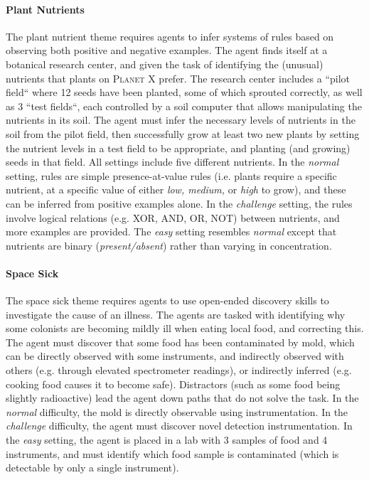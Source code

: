 \documentclass{article}
\newcommand{\planetX}{\textsc{Planet X}\xspace}
\begin{document}
\paragraph{Plant Nutrients} The plant nutrient theme requires agents to infer systems of rules based on observing both positive and negative examples.  The agent finds itself at a botanical research center, and given the task of identifying the (unusual) nutrients that plants on \planetX prefer.  The research center includes a ``pilot field`` where 12 seeds have been planted, some of which sprouted correctly, as well as 3 ``test fields``, each controlled by a soil computer that allows manipulating the nutrients in its soil.  The agent must infer the necessary levels of nutrients in the soil from the pilot field, then successfully grow at least two new plants by setting the nutrient levels in a test field to be appropriate, and planting (and growing) seeds in that field.  All settings include five different nutrients.  In the \textit{normal} setting, rules are simple presence-at-value rules (i.e. plants require a specific nutrient, at a specific value of either \textit{low, medium,} or \textit{high} to grow), and these can be inferred from positive examples alone.  In the \textit{challenge} setting, the rules involve logical relations (e.g. \textsc{XOR}, \textsc{AND}, \textsc{OR}, \textsc{NOT}) between nutrients, and more examples are provided.  The \textit{easy} setting resembles \textit{normal} except that nutrients are binary (\textit{present/absent}) rather than varying in concentration.

\paragraph{Space Sick} The space sick theme requires agents to use open-ended discovery skills to investigate the cause of an illness.  The agents are tasked with identifying why some colonists are becoming mildly ill when eating local food, and correcting this.  The agent must discover that some food has been contaminated by mold, which can be directly observed with some instruments, and indirectly observed with others (e.g. through elevated spectrometer readings), or indirectly inferred (e.g. cooking food causes it to become safe).  Distractors (such as some food being slightly radioactive) lead the agent down paths that do not solve the task.  In the \textit{normal} difficulty, the mold is directly observable using instrumentation.  In the \textit{challenge} difficulty, the agent must discover novel detection instrumentation.  In the \textit{easy} setting, the agent is placed in a lab with 3 samples of food and 4 instruments, and must identify which food sample is contaminated (which is detectable by only a single instrument). 
\end{document}
